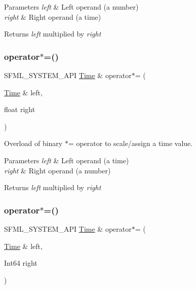\begin{DoxyParams}{Parameters}
{\em left} & Left operand (a number) \\
\hline
{\em right} & Right operand (a time)\\
\hline
\end{DoxyParams}
\begin{DoxyReturn}{Returns}
{\itshape left} multiplied by {\itshape right} 
\end{DoxyReturn}
\mbox{\label{classsf_1_1_time_a8996b6a6fcb8f3854b486b8e43949b50}} 
\subsubsection{\texorpdfstring{operator$\ast$=()}{operator*=()}\hspace{0.1cm}{\footnotesize\ttfamily [1/2]}}
{\footnotesize\ttfamily S\+F\+M\+L\+\_\+\+S\+Y\+S\+T\+E\+M\+\_\+\+A\+PI \hyperlink{classsf_1_1_time}{Time} \& operator$\ast$= (\begin{DoxyParamCaption}\item[{\hyperlink{classsf_1_1_time}{Time} \&}]{left,  }\item[{float}]{right }\end{DoxyParamCaption})\hspace{0.3cm}{\ttfamily [related]}}



Overload of binary $\ast$= operator to scale/assign a time value. 


\begin{DoxyParams}{Parameters}
{\em left} & Left operand (a time) \\
\hline
{\em right} & Right operand (a number)\\
\hline
\end{DoxyParams}
\begin{DoxyReturn}{Returns}
{\itshape left} multiplied by {\itshape right} 
\end{DoxyReturn}
\mbox{\label{classsf_1_1_time_a6656a0a1a1802009a72d93fbba61f24a}} 
\subsubsection{\texorpdfstring{operator$\ast$=()}{operator*=()}\hspace{0.1cm}{\footnotesize\ttfamily [2/2]}}
{\footnotesize\ttfamily S\+F\+M\+L\+\_\+\+S\+Y\+S\+T\+E\+M\+\_\+\+A\+PI \hyperlink{classsf_1_1_time}{Time} \& operator$\ast$= (\begin{DoxyParamCaption}\item[{\hyperlink{classsf_1_1_time}{Time} \&}]{left,  }\item[{Int64}]{right }\end{DoxyParamCaption})\hspace{0.3cm}{\ttfamily [related]}}



